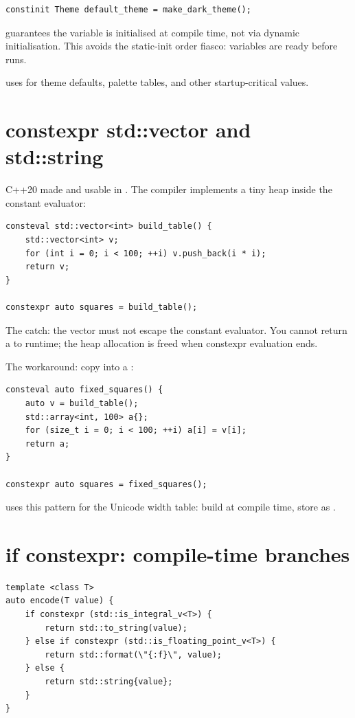 \begin{lstlisting}
constinit Theme default_theme = make_dark_theme();
\end{lstlisting}

 guarantees the variable is initialised at
compile time, not via dynamic initialisation. This avoids the
static-init order fiasco:  variables are ready
before  runs.

\maya{} uses  for theme defaults, palette
tables, and other startup-critical values.

\section{constexpr std::vector and std::string}

C++20 made  and  usable in
. The compiler implements a tiny heap inside the
constant evaluator:

\begin{lstlisting}
consteval std::vector<int> build_table() {
    std::vector<int> v;
    for (int i = 0; i < 100; ++i) v.push_back(i * i);
    return v;
}

constexpr auto squares = build_table();
\end{lstlisting}

The catch: the vector must not escape the constant evaluator.
You cannot return a  to runtime;
the heap allocation is freed when constexpr evaluation ends.

The workaround: copy into a :

\begin{lstlisting}
consteval auto fixed_squares() {
    auto v = build_table();
    std::array<int, 100> a{};
    for (size_t i = 0; i < 100; ++i) a[i] = v[i];
    return a;
}

constexpr auto squares = fixed_squares();
\end{lstlisting}

\maya{} uses this pattern for the Unicode width table: build at
compile time, store as .

\section{if constexpr: compile-time branches}

\begin{lstlisting}
template <class T>
auto encode(T value) {
    if constexpr (std::is_integral_v<T>) {
        return std::to_string(value);
    } else if constexpr (std::is_floating_point_v<T>) {
        return std::format(\"{:f}\", value);
    } else {
        return std::string{value};
    }
}
\end{lstlisting}

